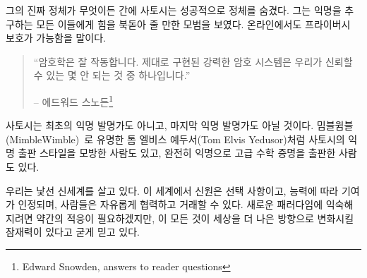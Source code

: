 \begin{comment}
	Whatever his real identity might be, Satoshi was successful in hiding
	it. He set an encouraging example for everyone who wishes to remain
	anonymous: it is possible to have privacy online.
\end{comment}
그의 진짜 정체가 무엇이든 간에 사토시는 성공적으로 정체를 숨겼다.
그는 익명을 추구하는 모든 이들에게 힘을 북돋아 줄 만한 모범을 보였다.
온라인에서도 프라이버시 보호가 가능함을 말이다.

\begin{quotation}\begin{samepage}
		\enquote{암호학은 잘 작동합니다. 제대로 구현된 강력한 암호 시스템은 우리가 신뢰할 수 있는 몇 안 되는 것 중 하나입니다.}
		\begin{flushright} -- 에드워드 스노든\footnote{Edward Snowden, answers to reader questions\cite{snowden}}
\end{flushright}\end{samepage}\end{quotation}

\begin{comment}
	Satoshi wasn't the first pseudonymous or anonymous inventor, and he won't be the
	last. Some have directly imitated this pseudonymous publication style, like Tom
	Elvis Yedusor of MimbleWimble~\cite{mimblewimble-origin} fame, while others have
	published advanced mathematical proofs while remaining completely
	anonymous~\cite{4chan-math}.
\end{comment}
사토시는 최초의 익명 발명가도 아니고, 마지막 익명 발명가도 아닐 것이다.
밈블윔블(MimbleWimble)~\cite{mimblewimble-origin}로 유명한 톰 엘비스 예두서(Tom Elvis Yedusor)처럼 사토시의 익명 출판 스타일을 모방한 사람도 있고,
완전히 익명으로 고급 수학 증명을 출판한 사람도 있다.~\cite{4chan-math}


\begin{comment}
	It is a strange new world we are living in. A world where identity is
	optional, contributions are accepted based on merit, and people can
	collaborate and transact freely. It will take some adjustment to get
	comfortable with these new paradigms, but I strongly believe that all of
	this has the potential to change the world for the better.
\end{comment}
우리는 낯선 신세계를 살고 있다. 
이 세계에서 신원은 선택 사항이고, 능력에 따라 기여가 인정되며, 사람들은 자유롭게 협력하고 거래할 수 있다.
새로운 패러다임에 익숙해지려면 약간의 적응이 필요하겠지만, 이 모든 것이 세상을 더 나은 방향으로 변화시킬 잠재력이 있다고 굳게 믿고 있다.


